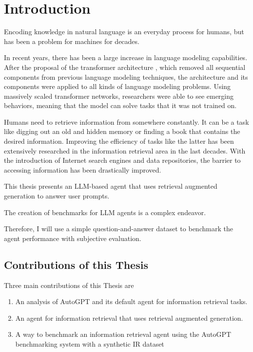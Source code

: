 \documentclass[../main.tex]{subfiles}
\begin{document}
\chapter{Introduction}
\label{ch:introduction}

Encoding knowledge in natural language is an everyday process for humans,
but has been a problem for machines for decades.

In recent years, there has been a large increase in language modeling capabilities.
After the proposal of the transformer architecture \cite{Vaswani2017},
which removed all sequential components from previous language modeling techniques,
the architecture and its components were applied to all kinds of language modeling problems.
Using massively scaled transformer networks, researchers were able to
see emerging behaviors, meaning that the model can solve tasks that it was not trained on.

Humans need to retrieve information from somewhere constantly.
It can be a task like digging out an old and hidden memory or finding a book that contains the desired information.
Improving the efficiency of tasks like the latter has been extensively researched in the information retrieval area in the last decades.
With the introduction of Internet search engines and data repositories, the barrier to accessing information has been drastically improved.

This thesis presents an LLM-based agent that uses retrieval augmented generation to answer user prompts.

The creation of benchmarks for LLM agents is a complex endeavor.

Therefore, I will use a simple question-and-answer dataset to benchmark the agent performance with subjective evaluation.

\section{Contributions of this Thesis}

Three main contributions of this Thesis are

\begin{enumerate}
    \item An analysis of AutoGPT and its default agent for information retrieval tasks.
    \item An agent for information retrieval that uses retrieval augmented generation.
    \item A way to benchmark an information retrieval agent using the AutoGPT benchmarking system with a synthetic IR dataset
\end{enumerate}
\end{document}
